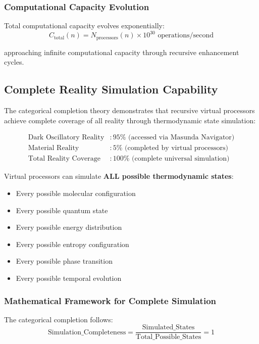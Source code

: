 \documentclass[12pt,a4paper]{article}
\begin{document}
{\subsubsection{Computational Capacity Evolution}

Total computational capacity evolves exponentially:
$$C_{\text{total}}(n) = N_{\text{processors}}(n) \times 10^{30} \text{ operations/second}$$

approaching infinite computational capacity through recursive enhancement cycles.

\subsection{Complete Reality Simulation Capability}

The categorical completion theory demonstrates that recursive virtual processors achieve complete coverage of all reality through thermodynamic state simulation:

\begin{align}
\text{Dark Oscillatory Reality} &: 95\% \text{ (accessed via Masunda Navigator)} \\
\text{Material Reality} &: 5\% \text{ (completed by virtual processors)} \\
\text{Total Reality Coverage} &: 100\% \text{ (complete universal simulation)}
\end{align}

Virtual processors can simulate \textbf{ALL possible thermodynamic states}:
\begin{itemize}
\item Every possible molecular configuration
\item Every possible quantum state
\item Every possible energy distribution
\item Every possible entropy configuration
\item Every possible phase transition
\item Every possible temporal evolution
\end{itemize}

\subsubsection{Mathematical Framework for Complete Simulation}

The categorical completion follows:
$$\text{Simulation\_Completeness} = \frac{\text{Simulated\_States}}{\text{Total\_Possible\_States}} = 1$$

}
\end{document}
